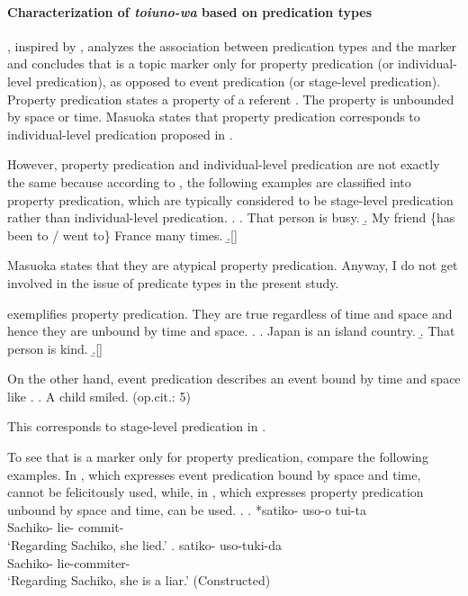 \paragraph{Characterization of \textit{toiuno-wa} based on predication types}

, inspired by ,
analyzes the association between predication types and
the marker  and concludes that
 is a topic marker only for property predication (or individual-level predication),
as opposed to event predication (or stage-level predication).
Property predication states a property of a referent \cite{masuoka87,masuoka08}.
The property is unbounded by space or time.
Masuoka states that property predication corresponds to
individual-level predication proposed in .%
 \footnotemark
 \footnotetext
 {
 However, property predication and individual-level predication are
 not exactly the same because
 according to ,
 the following examples are classified into property predication,
 which are typically considered to be stage-level predication rather than
 individual-level predication.
 \ex.
  \a. That person is busy.
  \b. My friend \{has been to / went to\} France many times.
  \b.[] \hfill{\cite[5--6, translated by NN]{masuoka08p}}
 
 Masuoka states that they are atypical property predication.
 Anyway, I do not get involved in the issue of predicate types in the present study.
 }
\Next exemplifies property predication.
They are true regardless of time and space and hence
they are unbound by time and space.
%
\ex.
 \a. Japan is an island country.
 \b. That person is kind.
 \b.[] \hfill{\cite[4, translated by NN]{masuoka08p}}

On the other hand,
event predication describes an event bound by time and space like \Next.
%
\ex. A child smiled.  \hfill{(op.cit.: 5)}

This corresponds to stage-level predication in .

To see that  is a marker only for property predication,
compare the following examples.
In \Next[a], which expresses event predication bound by space and time,
 cannot be felicitously used,
while, in \Next[b], which expresses property predication
unbound by space and time,
 can be used.
%
\ex.\label{ExSatiko}
\ag. *satiko- uso-o tui-ta \\
     Sachiko- lie- commit- \\
     `Regarding Sachiko, she lied.'
     \hfill{\cite[96]{masuoka12}}
\bg. satiko- uso-tuki-da \\
     Sachiko- lie-commiter- \\
     `Regarding Sachiko, she is a liar.'
     \hfill{(Constructed)}


